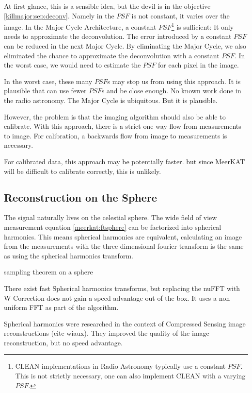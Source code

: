 At first glance, this is a sensible idea, but the devil is in the objective \eqref{killmajor:sep:deconv}. Namely in the $PSF$ is not constant, it varies over the image. In the Major Cycle Architecture, a constant $PSF$\footnote{CLEAN implementations in Radio Astronomy typically use a constant $PSF$. This is not strictly necessary, one can also implement CLEAN with a varying $PSF$.} is sufficient: It only needs to approximate the deconvolution. The error introduced by a constant $PSF$ can be reduced in the next Major Cycle. By eliminating the Major Cycle, we also eliminated the chance to approximate the deconvolution with a constant $PSF$. In the worst case, we would need to estimate the $PSF$ for each pixel in the image.

In the worst case, these many $PSF$s may stop us from using this approach. It is plausible that can use fewer $PSF$s and be close enough. No known work done in the radio astronomy. The Major Cycle is ubiquitous. But it is plausible.

However, the problem is that the imaging algorithm should also be able to calibrate. With this approach, there is a strict one way flow from measurements to image. For calibration, a backwards flow from image to measurements is necessary.

For calibrated data, this approach may be potentially faster. but since MeerKAT will be difficult to calibrate correctly, this is unlikely.


\subsection{Reconstruction on the Sphere}
The signal naturally lives on the celestial sphere. The wide field of view measurement equation \eqref{meerkat:ftsphere} can be factorized into spherical harmonics. This means spherical harmonics are equivalent, calculating an image from the measurements with the three dimensional fourier transform is the same as using the spherical harmonics transform. \cite{shaw2014all}

\cite{mcewen2013sparse}sampling theorem on a sphere

There exist fast Spherical harmonics transforms, but replacing the nuFFT with W-Correction does not gain a speed advantage out of the box. It uses a non-uniform FFT as part of the algorithm.

Spherical harmonics were researched in the context of Compressed Sensing image reconstructions (cite wiaux). They improved the quality of the image reconstruction, but no speed advantage.

